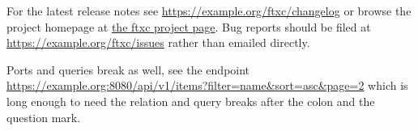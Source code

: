\documentclass[11pt]{article}
\begin{document}
\pagestyle{empty}

For the latest release notes see \url{https://example.org/ftxc/changelog}
or browse the project homepage at \href{https://example.org/ftxc}{the ftxc
project page}. Bug reports should be filed at
\url{https://example.org/ftxc/issues} rather than emailed directly.

Ports and queries break as well, see the endpoint
\url{https://example.org:8080/api/v1/items?filter=name&sort=asc&page=2}
which is long enough to need the relation and query breaks after the
colon and the question mark.
\end{document}
